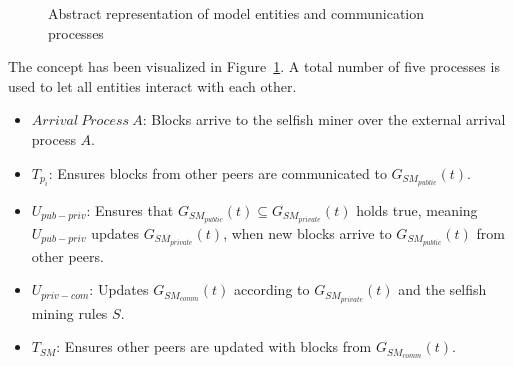 \begin{figure}[t]
\begin{center}
\end{center}
   \caption{Abstract representation of model entities and communication processes}
\label{fig:model_vis}

\end{figure}
The concept has been visualized in Figure~\ref{fig:model_vis}.
A total number of five processes is used to let all entities interact with each other.
\begin{itemize}
\item $Arrival~Process~A$: Blocks arrive to the selfish miner over the external arrival process $A$.

\item $T_{p_i}$: Ensures blocks from other peers are communicated to $G_{SM_{public}}(t)$.
\item $U_{pub-priv}$: Ensures that $G_{SM_{public}}(t)\subseteq G_{SM_{private}}(t)$ holds true, meaning $U_{pub-priv}$ updates $G_{SM_{private}}(t)$, when new blocks arrive to $G_{SM_{public}}(t)$ from other peers.
\item $U_{priv-com}$: Updates $G_{SM_{comm}}(t)$ according to $G_{SM_{private}}(t)$ and the selfish mining rules $S$.

\item $T_{SM}$: Ensures other peers are updated with blocks from $G_{SM_{comm}}(t)$.
\end{itemize}

